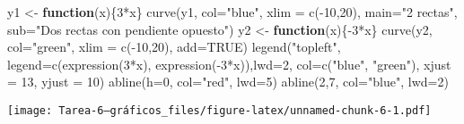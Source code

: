 \documentclass[
]{article}
\newenvironment{Shaded}{\begin{snugshade}}{\end{snugshade}}
\newcommand{\AttributeTok}[1]{\textcolor[rgb]{0.77,0.63,0.00}{#1}}
\newcommand{\ConstantTok}[1]{\textcolor[rgb]{0.00,0.00,0.00}{#1}}
\newcommand{\ControlFlowTok}[1]{\textcolor[rgb]{0.13,0.29,0.53}{\textbf{#1}}}
\newcommand{\DecValTok}[1]{\textcolor[rgb]{0.00,0.00,0.81}{#1}}
\newcommand{\FunctionTok}[1]{\textcolor[rgb]{0.00,0.00,0.00}{#1}}
\newcommand{\NormalTok}[1]{#1}
\newcommand{\OtherTok}[1]{\textcolor[rgb]{0.56,0.35,0.01}{#1}}
\newcommand{\SpecialCharTok}[1]{\textcolor[rgb]{0.00,0.00,0.00}{#1}}
\newcommand{\StringTok}[1]{\textcolor[rgb]{0.31,0.60,0.02}{#1}}
\begin{document}
\begin{Shaded}
\begin{Highlighting}[]
\NormalTok{y1 }\OtherTok{\textless{}{-}} \ControlFlowTok{function}\NormalTok{(x)\{}\DecValTok{3}\SpecialCharTok{*}\NormalTok{x\}}
\FunctionTok{curve}\NormalTok{(y1, }\AttributeTok{col=}\StringTok{"blue"}\NormalTok{, }\AttributeTok{xlim =} \FunctionTok{c}\NormalTok{(}\SpecialCharTok{{-}}\DecValTok{10}\NormalTok{,}\DecValTok{20}\NormalTok{), }\AttributeTok{main=}\StringTok{"2 rectas"}\NormalTok{, }\AttributeTok{sub=}\StringTok{"Dos rectas con pendiente opuesto"}\NormalTok{)}
\NormalTok{y2 }\OtherTok{\textless{}{-}} \ControlFlowTok{function}\NormalTok{(x)\{}\SpecialCharTok{{-}}\DecValTok{3}\SpecialCharTok{*}\NormalTok{x\}}
\FunctionTok{curve}\NormalTok{(y2, }\AttributeTok{col=}\StringTok{"green"}\NormalTok{, }\AttributeTok{xlim =} \FunctionTok{c}\NormalTok{(}\SpecialCharTok{{-}}\DecValTok{10}\NormalTok{,}\DecValTok{20}\NormalTok{), }\AttributeTok{add=}\ConstantTok{TRUE}\NormalTok{)}
\FunctionTok{legend}\NormalTok{(}\StringTok{"topleft"}\NormalTok{, }\AttributeTok{legend=}\FunctionTok{c}\NormalTok{(}\FunctionTok{expression}\NormalTok{(}\DecValTok{3}\SpecialCharTok{*}\NormalTok{x), }\FunctionTok{expression}\NormalTok{(}\SpecialCharTok{{-}}\DecValTok{3}\SpecialCharTok{*}\NormalTok{x)),}\AttributeTok{lwd=}\DecValTok{2}\NormalTok{, }\AttributeTok{col=}\FunctionTok{c}\NormalTok{(}\StringTok{"blue"}\NormalTok{, }\StringTok{"green"}\NormalTok{), }\AttributeTok{xjust =} \DecValTok{13}\NormalTok{, }\AttributeTok{yjust =} \DecValTok{10}\NormalTok{)}
\FunctionTok{abline}\NormalTok{(}\AttributeTok{h=}\DecValTok{0}\NormalTok{, }\AttributeTok{col=}\StringTok{"red"}\NormalTok{, }\AttributeTok{lwd=}\DecValTok{5}\NormalTok{)}
\FunctionTok{abline}\NormalTok{(}\DecValTok{2}\NormalTok{,}\DecValTok{7}\NormalTok{, }\AttributeTok{col=}\StringTok{"blue"}\NormalTok{, }\AttributeTok{lwd=}\DecValTok{2}\NormalTok{)}
\end{Highlighting}
\end{Shaded}

\texttt{[image: Tarea-6--gráficos\_files/figure-latex/unnamed-chunk-6-1.pdf]}
\end{document}
